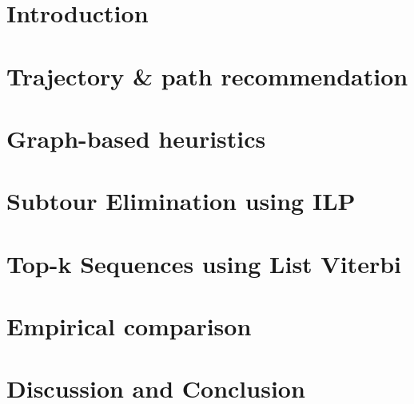 \documentclass[sigconf]{acmart}
\begin{document}

\maketitle

\section{Introduction}


\section{Trajectory \& path recommendation}
\label{sec:background}


\section{Graph-based heuristics}
\label{sec:heuristics}


\section{Subtour Elimination using ILP}
\label{sec:ilp}


\section{Top-k Sequences using List Viterbi}
\label{sec:viterbi}


%

\section{Empirical comparison}
\label{sec:experiments}


\section{Discussion and Conclusion}
\label{sec:discussion}




 
\end{document}
